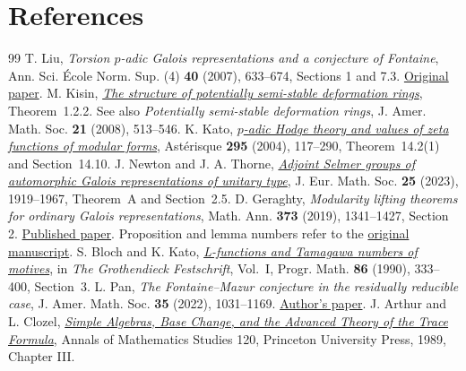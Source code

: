 \documentclass[a4paper,11pt]{article}
\theoremstyle{definition}
\theoremstyle{remark}
\numberwithin{equation}{section}
\begin{document}
\section{References}\label{nav:bibliography-XI}
\begingroup{}\begin{thebibliography}{99}\small
{} T. Liu, \emph{Torsion \(p\)-adic Galois representations and a conjecture of Fontaine}, Ann. Sci. \'Ecole Norm. Sup. (4) \textbf{40} (2007), 633--674, Sections 1 and 7.3. \href{https://www.math.purdue.edu/~tongliu/pub/fontainel.pdf}{Original paper}.
 M. Kisin, \href{https://people.math.harvard.edu/~kisin/dvifiles/licm.pdf}{\emph{The structure of potentially semi-stable deformation rings}}, Theorem~1.2.2. See also \emph{Potentially semi-stable deformation rings}, J. Amer. Math. Soc. \textbf{21} (2008), 513--546.
 K. Kato, \href{https://archive.numdam.org/item/AST_2004__295__117_0.pdf}{\emph{\(p\)-adic Hodge theory and values of zeta functions of modular forms}}, Ast\'erisque \textbf{295} (2004), 117--290, Theorem~14.2(1) and Section~14.10.
 J. Newton and J. A. Thorne, \href{https://arxiv.org/pdf/1912.11265}{\emph{Adjoint Selmer groups of automorphic Galois representations of unitary type}}, J. Eur. Math. Soc. \textbf{25} (2023), 1919--1967, Theorem~A and Section~2.5.
 D. Geraghty, \emph{Modularity lifting theorems for ordinary Galois representations}, Math. Ann. \textbf{373} (2019), 1341--1427, Section 2. \href{https://doi.org/10.1007/s00208-018-1742-4}{Published paper}. Proposition and lemma numbers refer to the \href{https://citeseerx.ist.psu.edu/document?doi=8faa2d675c94ae78d0ac8ebb3f9d4f69ede42d44\&repid=rep1\&type=pdf}{original manuscript}.
 S. Bloch and K. Kato, \href{https://virtualmath1.stanford.edu/~conrad/BSDseminar/refs/BKTamagawa.pdf}{\emph{L-functions and Tamagawa numbers of motives}}, in \emph{The Grothendieck Festschrift}, Vol.~I, Progr. Math. \textbf{86} (1990), 333--400, Section~3.
 L. Pan, \emph{The Fontaine--Mazur conjecture in the residually reducible case}, J. Amer. Math. Soc. \textbf{35} (2022), 1031--1169. \href{https://arxiv.org/abs/1901.07166}{Author's paper}.
 J. Arthur and L. Clozel, \href{https://www.claymath.org/library/cw/arthur/pdf/30.pdf}{\emph{Simple Algebras, Base Change, and the Advanced Theory of the Trace Formula}}, Annals of Mathematics Studies 120, Princeton University Press, 1989, Chapter III.

\end{thebibliography}
\end{document}
